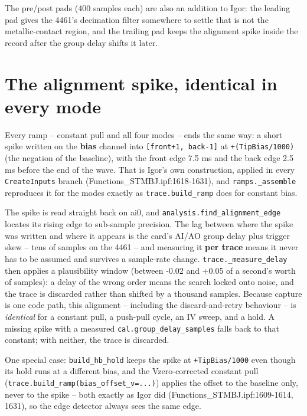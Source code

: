 The pre/post pads (400 samples each) are also an addition to Igor: the leading pad gives the 4461's decimation filter somewhere to settle that is not the metallic-contact region, and the trailing pad keeps the alignment spike inside the record after the group delay shifts it later.

\section{The alignment spike, identical in every mode}

Every ramp -- constant pull and all four modes -- ends the same way: a short spike written on the \textbf{bias} channel into \texttt{[front+1,\discretionary{}{}{} back-1]} at \texttt{+(Tip\discretionary{}{}{}Bias/\discretionary{}{}{}1000)} (the negation of the baseline), with the front edge 7.5 ms and the back edge 2.5 ms before the end of the wave. That is Igor's own construction, applied in every \texttt{Create\discretionary{}{}{}Inputs} branch (Functions\_STMBJ.ipf:1618-1631), and \texttt{ramps.\discretionary{}{}{}\_\discretionary{}{}{}assemble} reproduces it for the modes exactly as \texttt{trace.\discretionary{}{}{}build\_\discretionary{}{}{}ramp} does for constant bias.

The spike is read straight back on ai0, and \texttt{analysis.\discretionary{}{}{}find\_\discretionary{}{}{}alignment\_\discretionary{}{}{}edge} locates its rising edge to sub-sample precision. The lag between where the spike was written and where it appears is the card's AI/AO group delay plus trigger skew -- tens of samples on the 4461 -- and measuring it \textbf{per trace} means it never has to be assumed and survives a sample-rate change. \texttt{trace.\discretionary{}{}{}\_\discretionary{}{}{}measure\_\discretionary{}{}{}delay} then applies a plausibility window (between -0.02 and +0.05 of a second's worth of samples): a delay of the wrong order means the search locked onto noise, and the trace is discarded rather than shifted by a thousand samples. Because capture is one code path, this alignment -- including the discard-and-retry behaviour -- is \emph{identical} for a constant pull, a push-pull cycle, an IV sweep, and a hold. A missing spike with a measured \texttt{cal.\discretionary{}{}{}group\_\discretionary{}{}{}delay\_\discretionary{}{}{}samples} falls back to that constant; with neither, the trace is discarded.

One special case: \texttt{build\_\discretionary{}{}{}hb\_\discretionary{}{}{}hold} keeps the spike at \texttt{+Tip\discretionary{}{}{}Bias/\discretionary{}{}{}1000} even though its hold runs at a different bias, and the Vzero-corrected constant pull (\texttt{trace.\discretionary{}{}{}build\_\discretionary{}{}{}ramp(bias\_\discretionary{}{}{}offset\_\discretionary{}{}{}v=.\discretionary{}{}{}.\discretionary{}{}{}.\discretionary{}{}{})}) applies the offset to the baseline only, never to the spike -- both exactly as Igor did (Functions\_STMBJ.ipf:1609-1614, 1631), so the edge detector always sees the same edge.

